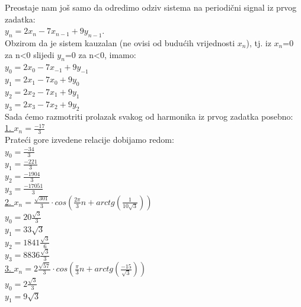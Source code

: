 \documentclass[12pt]{article}
\begin{document}
\begin{enumerate}
\begin{center}
	    \vspace{0.25cm}
	    Preostaje nam još samo da odredimo odziv sistema na periodični signal iz prvog zadatka:\\
	    $y_n = 2 x_n - 7 x_{n-1} + 9y_{n-1}$.\\Obzirom da je sistem kauzalan (ne ovisi od budućih vrijednosti $x_n$), tj. iz $x_n$=0 za n<0 slijedi $y_n$=0 za n<0, imamo:\\
	    $y_0 = 2 x_0 - 7 x_{-1} + 9y_{-1}$\\
	    $y_1 = 2 x_1 - 7 x_{0} + 9y_{0}$\\
	    $y_2 = 2 x_2 - 7 x_{1} + 9y_{1}$\\
	    $y_3 = 2 x_3 - 7 x_{2} + 9y_{2}$\\
	    \vspace{0.25cm}
	    Sada ćemo razmotriti prolazak svakog od harmonika iz prvog zadatka posebno:\\
	    \underline{1. $x_n =\frac{-17}{3}$} \\
	    \vspace{0.25cm}
	    Prateći gore izvedene relacije dobijamo redom:\\
	      $y_0 = \frac{-34}{3}$\\ \vspace{0.3cm}
	    $y_1 = \frac{-221}{3}$ \\\vspace{0.3cm}
	    $y_2 =\frac{-1904}{3}$\\\vspace{0.3cm}
	    $y_3 = \frac{-17051}{3}$\\\vspace{0.3cm}
	     \vspace{0.25cm}
	     \underline{2. $x_n =\frac{\sqrt{301}}{3} \cdot cos(\frac{2\pi}{3}n +  arctg(\frac{1}{10\sqrt{3}}))$}\\
	     \vspace{0.25cm}
	        $y_0 = 20\frac{\sqrt{3}}{3}$\\
	    $y_1 = 33\sqrt{3}$\\
	    $y_2 = 1841\frac{\sqrt{3}}{6}$\\
	    $y_3 = 8836\frac{\sqrt{3}}{3}$\\
	      \newpage
	     \underline{3. $x_n =  2\frac{\sqrt{57}}{3}\cdot cos (\frac{\pi}{3}n + arctg (\frac{-15}{\sqrt{3}}))$}\\
	     \vspace{0.25cm}
	        $y_0 = 2\frac{\sqrt{3}}{3}$ \\
	    $y_1 = 9\sqrt{3}$\\

\end{center}
\end{enumerate}
\end{document}

